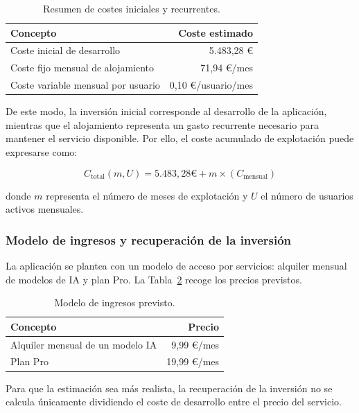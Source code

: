 \begin{table}[H]
	\centering
	\begin{tabular}{@{}lr@{}}
		\toprule
		\textbf{Concepto} & \textbf{Coste estimado} \\
		\midrule
		Coste inicial de desarrollo & 5.483,28 € \\
		Coste fijo mensual de alojamiento & 71,94 €/mes \\
		Coste variable mensual por usuario & 0,10 €/usuario/mes \\
		\bottomrule
	\end{tabular}
	\caption{Resumen de costes iniciales y recurrentes.}
	\label{tabla:costes_explotacion_resumen}
\end{table}

De este modo, la inversión inicial corresponde al desarrollo de la aplicación, mientras que el alojamiento representa un gasto recurrente necesario para mantener el servicio disponible. Por ello, el coste acumulado de explotación puede expresarse como:

\[
C_{\text{total}}(m,U) = 5.483,28\text{€} + m \times (C_{\text{mensual}})
\]

donde \(m\) representa el número de meses de explotación y \(U\) el número de usuarios activos mensuales.

\subsubsection{Modelo de ingresos y recuperación de la inversión}

La aplicación se plantea con un modelo de acceso por servicios: alquiler mensual de modelos de IA y plan Pro. La Tabla~\ref{tabla:modelo_ingresos} recoge los precios previstos.

\begin{table}[H]
	\centering
	\begin{tabular}{@{}lr@{}}
		\toprule
		\textbf{Concepto} & \textbf{Precio} \\
		\midrule
		Alquiler mensual de un modelo IA & 9,99 €/mes \\
		Plan Pro & 19,99 €/mes \\
		\bottomrule
	\end{tabular}
	\caption{Modelo de ingresos previsto.}
	\label{tabla:modelo_ingresos}
\end{table}

Para que la estimación sea más realista, la recuperación de la inversión no se calcula únicamente dividiendo el coste de desarrollo entre el precio del servicio.


